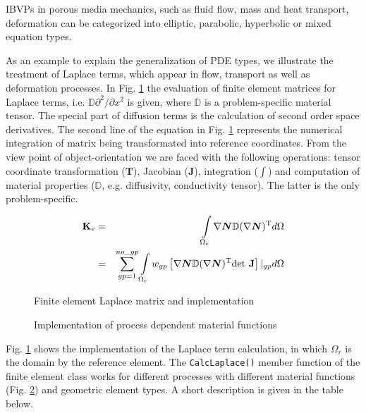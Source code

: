 IBVPs in porous media mechanics, such as fluid flow, mass and heat 
transport, deformation can be categorized into elliptic, parabolic, 
hyperbolic or mixed equation types.

As an example to explain the generalization of PDE types, we
illustrate the treatment of Laplace terms, which appear in flow,
transport as well as deformation processes. In Fig. \ref{fig:lap}
the evaluation of finite element matrices for Laplace terms, i.e.
$\mathbb{D}\partial^2/\partial x^2$ is given, where $\mathbb{D}$ is 
a problem-specific material tensor. The special part of diffusion 
terms is the calculation of second order space derivatives. The 
second line of the equation in Fig. \ref{fig:lap} represents the 
  numerical integration of matrix being transformated into reference coordinates. From the view point of 
object-orientation we are faced with the following operations: 
tensor coordinate transformation ($\mathbf{T}$), Jacobian 
($\mathbf{J}$), integration ($\int$) and computation of material 
properties ($\mathbb D$, e.g. diffusivity, conductivity tensor). The latter is the only problem-specific.

\begin{eqnarray}
\mathbf K_e 
&=&
\int\limits_{\Omega_e} \nabla \bm N \mathbb{D}(\nabla\bm N)^{\mathrm{T}} d\Omega \\
&=& 
\sum\limits_{gp=1}\limits^{no\_gp} \int\limits_{\Omega_r} w_{gp} 
\left[
\nabla \bm N \mathbb{D}(\nabla \bm N)^{\mathrm{T}} \mathrm{det}\ \mathbf{J} 
\right]
\vert_{gp} d\Omega
\end{eqnarray}

\begin{figure}[htb!]
\centering
{}
\caption{Finite element Laplace matrix and implementation}
\label{fig:lap}
\end{figure}

\begin{figure}[htb!]
\centering
{}
\caption{Implementation of process dependent material functions}
\label{fig:mat1}
\end{figure}

Fig. \ref{fig:lap} shows the implementation of the Laplace term
calculation, in which $\Omega_r$ is the domain by the reference 
element. The \texttt{CalcLaplace()} member function of the finite 
element class works for different processes with different material 
functions (Fig. \ref{fig:mat1}) and geometric element types. A short 
description is given in the table below.

